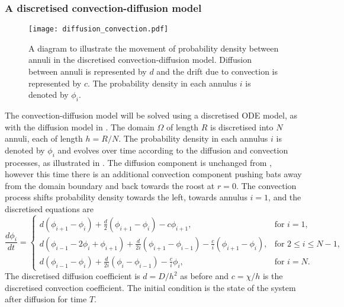 \subsubsection{A discretised convection-diffusion model}

 \begin{figure} [ht]
     \centering
         \texttt{[image: diffusion\_convection.pdf]}
         \caption{A diagram to illustrate the movement of probability density between annuli in the discretised convection-diffusion model. Diffusion between annuli is represented by $d$ and the drift due to convection is represented by $c$. The probability density in each annulus $i$ is denoted by $\phi_i$.}
     \label{fig:convection_diffusion_diag}
 \end{figure}

The convection-diffusion model will be solved using a discretised ODE model, as with the diffusion model in . The domain $\Omega$ of length $R$ is discretised into $N$ annuli, each of length $h = R/N$. The probability density in each annulus $i$ is denoted by $\phi_i$ and evolves over time according to the diffusion and convection processes, as illustrated in . The diffusion component is unchanged from , however this time there is an additional convection component pushing bats away from the domain boundary and back towards the roost at $r=0$. The convection process shifts probability density towards the left, towards annulus $i = 1$, and the discretised equations are
%
\begin{equation}
\frac{d\phi_i}{dt} = \begin{cases}
		d(\phi_{i+1} - \phi_i) + \frac{d}{2} (\phi_{i+1}-\phi_i) - c \phi_{i+1}, & \text{for } i = 1, \\
		d(\phi_{i-1}-2\phi_i +\phi_{i+1}) + \frac{d}{2i} (\phi_{i+1}-\phi_{i-1}) - \frac{c}{i}(\phi_{i+1}-\phi_{i}), & \text{for } 2 \leq i \leq N-1, \\
		d(\phi_{i-1}-\phi_i)  + \frac{d}{2i} (\phi_{i}-\phi_{i-1}) - \frac{c}{i}\phi_{i}, & \text{for } i = N.
		\end{cases}
        \label{eqn:discrete_convection}
\end{equation}
%
The discretised diffusion coefficient is $d = D/h^2$ as before and $c=\chi/h$ is the discretised convection coefficient. The initial condition is the state of the system after diffusion for time $T$.

